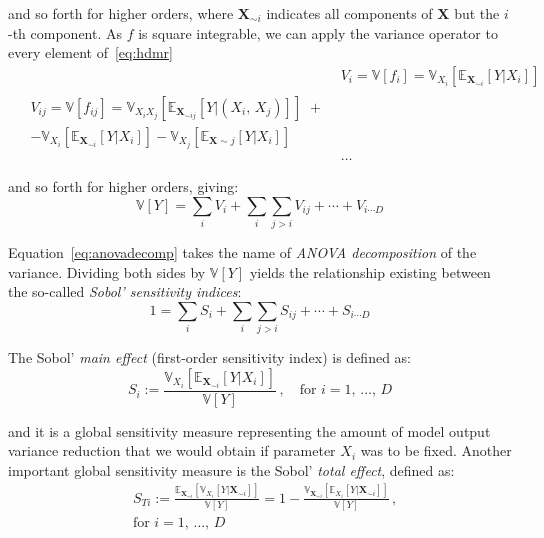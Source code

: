 \noindent
and so forth for higher orders, where $\mathbf{X}_{\sim i}$ indicates all components of $\mathbf{X}$ but the $i$-th component. As $f$ is square integrable, we can apply the variance operator to every element of~\eqref{eq:hdmr}
%
\begin{align}
    & V_{i} = \mathbb{V}[f_{i}] = \mathbb{V}_{X_i}[\mathbb{E}_{\mathbf{X}_{\sim i}}[Y|X_i]] \\
    \begin{split}
        & V_{ij} = \mathbb{V}[f_{ij}] = \mathbb{V}_{X_iX_j}[\mathbb{E}_{\mathbf{X}_{\sim ij}}[Y|(X_i,\,X_j)]]\,\,+ \\
        & - \mathbb{V}_{X_i}[\mathbb{E}_{\mathbf{X}_{\sim i}}[Y|X_i]] - \mathbb{V}_{X_j}[\mathbb{E}_{\mathbf{X}\sim j}[Y|X_i]]
    \end{split} \label{eq:varelements}\\
    &\dots
\end{align}

\noindent
and so forth for higher orders, giving:
%
\begin{equation}\label{eq:anovadecomp}
    \mathbb{V}[Y] = \sum_{i}V_{i} + \sum_{i}\sum_{j>i}V_{ij} + \cdots + V_{i\cdots D}
\end{equation}

\noindent
Equation~\eqref{eq:anovadecomp} takes the name of \textit{ANOVA decomposition} of the variance. Dividing both sides by $\mathbb{V}[Y]$ yields the relationship existing between the so-called \textit{Sobol' sensitivity indices}:
%
\begin{equation}\label{eq:sumofsobolindexes}
    1 = \sum_{i}S_{i} + \sum_{i}\sum_{j>i}S_{ij} + \cdots + S_{i\cdots D}
\end{equation}

\noindent
The Sobol' \textit{main effect} (first-order sensitivity index) is defined as:
%
\begin{equation}\label{eq:maineffect}
    S_{i} := \frac{\mathbb{V}_{X_i}[\mathbb{E}_{\mathbf{X}_{\sim i}}[Y|X_i]]}{\mathbb{V}[Y]}\,,\quad\text{for}\,\,i=1,\,\dots,\,D
\end{equation}

\noindent
and it is a global sensitivity measure representing the amount of model output variance reduction that we would obtain if parameter $X_i$ was to be fixed. Another important global sensitivity measure is the Sobol' \textit{total effect}, defined as:
%
\begin{align}\label{eq:totaleffect}
    & S_{Ti} := \frac{\mathbb{E}_{\mathbf{X}_{\sim i}}[\mathbb{V}_{X_i}[Y|\mathbf{X}_{\sim i}]]}{\mathbb{V}[Y]} = 1 - \frac{\mathbb{V}_{\mathbf{X}_{\sim i}}[\mathbb{E}_{X_i}[Y|\mathbf{X}_{\sim i}]]}{\mathbb{V}[Y]}\,, \\
    & \text{for}\,\,i=1,\,\dots,\,D
\end{align}

